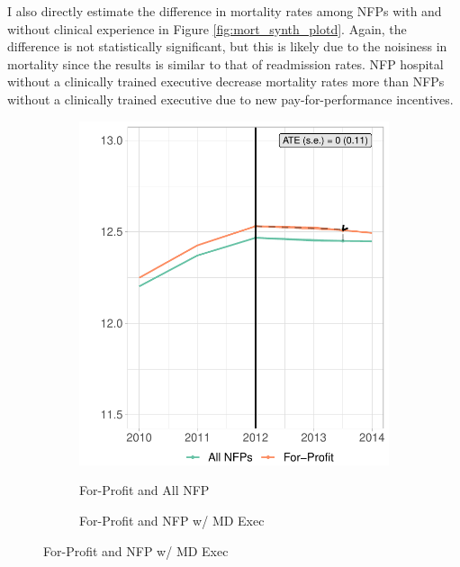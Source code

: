 \documentclass[12pt]{article}
\begin{document}
    I also directly estimate the difference in mortality rates among NFPs with and without clinical experience in Figure \ref{fig:mort_synth_plotd}. Again, the difference is not statistically significant, but this is likely due to the noisiness in mortality since the results is similar to that of readmission rates. NFP hospital without a clinically trained executive decrease mortality rates more than NFPs without a clinically trained executive due to new pay-for-performance incentives.

     \begin{figure}
     \caption{Mortality Rate Synthetic Difference in Differences Results}
     \centering
          \begin{subfigure}[b]{0.45\textwidth}
         \centering
         \caption{For-Profit and All NFP}
         \includegraphics[width=\textwidth]{Objects/mort_fp_nfp_synth_graph.pdf}
         \label{fig:mort_synth_plota}
     \end{subfigure}%
     \hfill
     \begin{subfigure}[b]{0.45\textwidth}
         \centering
         \caption{For-Profit and NFP w/ MD Exec}

\end{subfigure}
\end{figure}
\end{document}
